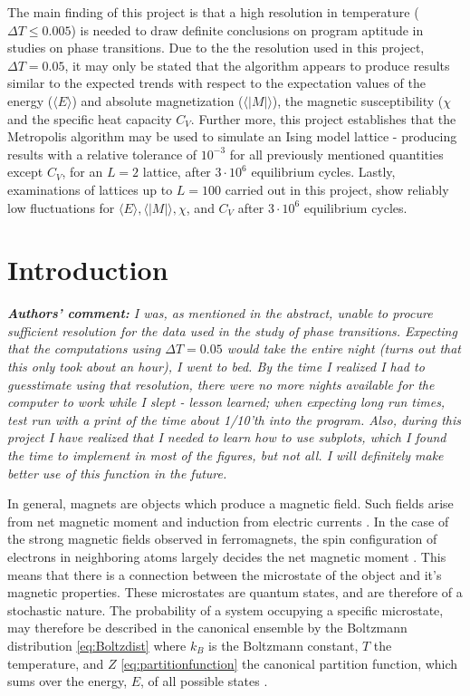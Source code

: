 \documentclass[%
oneside,                 %
final,                   %
10pt]{article}
\begin{document}
The main finding of this project is that a high resolution in temperature ($\Delta T \leq 0.005 $) is needed to draw definite conclusions on program aptitude in studies on phase transitions. Due to the the resolution used in this project, $\Delta T = 0.05$, it may only be stated that the algorithm appears to produce results similar to the expected trends with respect to the expectation values of the energy ($\langle E \rangle$) and absolute magnetization ($\langle |M| \rangle$), the magnetic susceptibility ($\chi$and the specific heat capacity $ C_V$. Further more, this project establishes that the Metropolis algorithm may be used to simulate an Ising model lattice - producing results with a relative tolerance of $10^{-3}$ for all previously mentioned quantities except $C_V$,
for an $L=2$ lattice, after $3\cdot 10^6$ equilibrium cycles. Lastly, examinations of lattices up to $L=100$ carried out in this project, show reliably low fluctuations for $\langle E \rangle, \langle |M| \rangle, \chi$, and $C_V$ after  $3\cdot 10^6$ equilibrium cycles.


\section{Introduction}
\textit{\textbf{Authors' comment:} I was, as mentioned in the abstract, unable to procure sufficient resolution for the data used in the study of phase transitions. Expecting that the computations using $\Delta T=0.05$ would take the entire night (turns out that this only took about an hour), I went to bed. By the time I realized I had to guesstimate using that resolution, there were no more nights available for the computer to work while I slept - lesson learned; when expecting long run times, test run with a print of the time about 1/10'th into the program. Also, during this project I have realized that I needed to learn how to use subplots, which I found the time to implement in most of the figures, but not all. I will definitely make better use of this function in the future. } \newline

In general, magnets are objects which produce a magnetic field. Such fields arise from net magnetic moment and induction from electric currents  \cite{FeynmanMM}. In the case of the strong magnetic fields observed in ferromagnets, the spin configuration of electrons in neighboring atoms largely decides the net magnetic moment \cite{FeynmanFM}. This means that there is a connection between the microstate of the object and it's magnetic properties. These microstates are quantum states, and are therefore of a stochastic nature. The probability of a system occupying a specific microstate, may therefore be described in the canonical ensemble by the Boltzmann distribution \eqref{eq:Boltzdist} where $k_B$ is the Boltzmann constant, $T$ the temperature,  and $Z$ \eqref{eq:partitionfunction} the canonical partition function, which sums over the energy, $E$, of all possible states \cite{HJ-SP}. 
\end{document}

